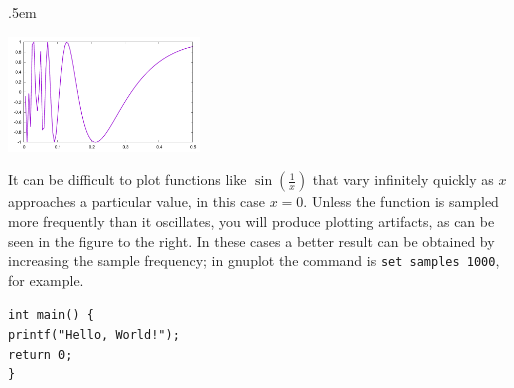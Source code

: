 \documentclass[12pt]{article}
\begin{document}
\openup.5em
\begin{floatingfigure}{2.25in}
\includegraphics[width=2in]{r2fig}  
\end{floatingfigure}   
It can be difficult to plot functions like $\sin(\frac{1}{x})$ that vary infinitely quickly as $x$ approaches a particular value, in this case $x=0$. 
Unless the function is sampled more frequently than it oscillates, you will produce plotting artifacts, as can be seen in the figure to the right.
In these cases a better result can be obtained by increasing the sample frequency; in gnuplot the command is {\tt set samples 1000}, for example.

{\tt int main() \{\\
    printf("Hello, World!");\\
    return 0;\\
\}}
\end{document}
